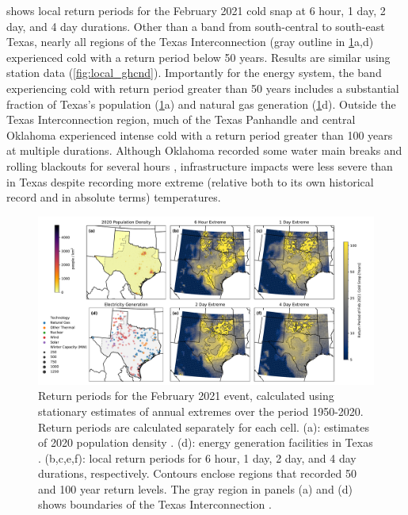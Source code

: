\documentclass[12pt]{iopart}
\begin{document}
 shows local return periods for the February 2021 cold snap at 6 hour, 1 day, 2 day, and 4 day durations.
Other than a band from south-central to south-east Texas, nearly all regions of the Texas Interconnection (gray outline in \cref{fig:local_era5}a,d) experienced cold with a return period below 50 years.
Results are similar using station data (\cref{fig:local_ghcnd}).
Importantly for the energy system, the band experiencing cold with return period greater than 50 years includes a substantial fraction of Texas’s population (\cref{fig:local_era5}a) and natural gas generation (\cref{fig:local_era5}d).
Outside the Texas Interconnection region, much of the Texas Panhandle and central Oklahoma experienced intense cold with a return period greater than 100 years at multiple durations.
Although Oklahoma recorded some water main breaks \cite{crum_water:2021} and rolling blackouts for several hours \cite{money_oklahoma:2021}, infrastructure impacts were less severe than in Texas despite recording more extreme (relative both to its own historical record and in absolute terms) temperatures.

\begin{figure}
  \centering
  \includegraphics[width=\textwidth]{local_rt_era5.pdf}
  \caption{
    Return periods for the February 2021 event, calculated using stationary estimates of annual extremes over the period 1950-2020.
    Return periods are calculated separately for each cell.
    (a): estimates of 2020 population density \cite{ciesin_gpwv4:2016}.
    (d): energy generation facilities in Texas \cite{useia_generators:2021}.
    (b,c,e,f): local return periods for 6 hour, 1 day, 2 day, and 4 day durations, respectively.
    Contours enclose regions that recorded 50 and 100 year return levels.
    The gray region in panels (a) and (d) shows boundaries of the Texas Interconnection \cite{useia_regions:2021}.
  }\label{fig:local_era5}
\end{figure}
\end{document}

